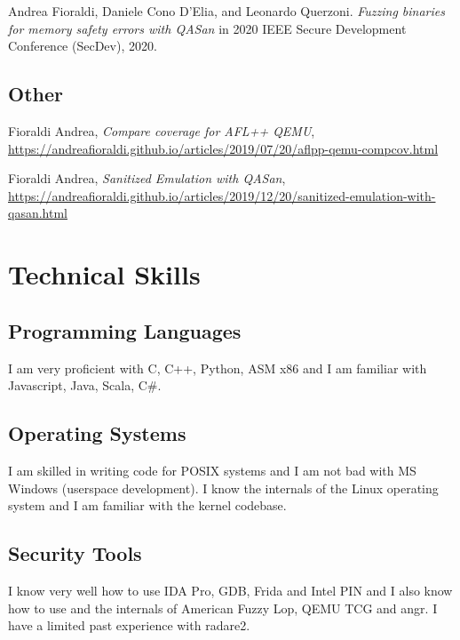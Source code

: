 \documentclass[10pt, a4paper]{article}
\newcommand{\years}[1]{\marginnote{\scriptsize #1}}
\begin{document}
\noindent
\years{2020} Andrea Fioraldi, Daniele Cono D’Elia, and Leonardo Querzoni. \textit{Fuzzing binaries for memory safety errors with QASan} in 2020 IEEE Secure Development Conference (SecDev), 2020.

\subsection*{Other}

\noindent
\years{2019} Fioraldi Andrea, \textit{Compare coverage for AFL++ QEMU}, \href{https://andreafioraldi.github.io/articles/2019/07/20/aflpp-qemu-compcov.html}{https://andreafioraldi.github.io/articles/2019/07/20/aflpp-qemu-compcov.html}

\noindent
\years{2019} Fioraldi Andrea, \textit{Sanitized Emulation with QASan}, \href{https://andreafioraldi.github.io/articles/2019/12/20/sanitized-emulation-with-qasan.html}{https://andreafioraldi.github.io/articles/2019/12/20/sanitized-emulation-with-qasan.html}

\section*{Technical Skills}

\subsection*{Programming Languages}

I am very proficient with C, C++, Python, ASM x86 and I am familiar with Javascript, Java, Scala, C\#.

\subsection*{Operating Systems}

I am skilled in writing code for POSIX systems and I am not bad with MS Windows (userspace development).
I know the internals of the Linux operating system and I am familiar with the kernel codebase.

\subsection*{Security Tools}

I know very well how to use IDA Pro, GDB, Frida and Intel PIN and I also know how to use and the internals of American Fuzzy Lop, QEMU TCG and angr.
I have a limited past experience with radare2.
\end{document}
